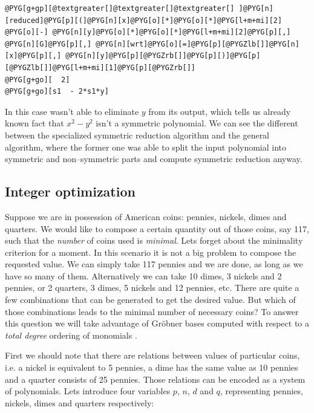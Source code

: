 \begin{Verbatim}[commandchars=@\[\]]
@PYG[g+gp][@textgreater[]@textgreater[]@textgreater[] ]@PYG[n][reduced]@PYG[p][(]@PYG[n][x]@PYG[o][*]@PYG[o][*]@PYG[l+m+mi][2] @PYG[o][-] @PYG[n][y]@PYG[o][*]@PYG[o][*]@PYG[l+m+mi][2]@PYG[p][,] @PYG[n][G]@PYG[p][,] @PYG[n][wrt]@PYG[o][=]@PYG[p][@PYGZlb[]]@PYG[n][x]@PYG[p][,] @PYG[n][y]@PYG[p][@PYGZrb[]]@PYG[p][)]@PYG[p][@PYGZlb[]]@PYG[l+m+mi][1]@PYG[p][@PYGZrb[]]
@PYG[g+go][  2]
@PYG[g+go][s1  - 2*s1*y]
\end{Verbatim}
\noindent
In this case \href{http://docs.python.org/library/functions.html\#reduce}{} wasn't able to eliminate $y$ from its output, which tells us already
known fact that $x^2 - y^2$ isn't a symmetric polynomial. We can see the different between the
specialized symmetric reduction algorithm and the general algorithm, where the former one was
able to split the input polynomial into symmetric and non--symmetric parts and compute symmetric
reduction anyway.


\subsection{Integer optimization}

Suppose we are in possession of American coins: pennies, nickels, dimes and quarters. We would like to
compose a certain quantity out of those coins, say 117, such that the \emph{number} of coins used is \emph{minimal}.
Lets forget about the minimality criterion for a moment. In this scenario it is not a big problem to
compose the requested value. We can simply take 117 pennies and we are done, as long as we have so
many of them. Alternatively we can take 10 dimes, 3 nickels and 2 pennies, or 2 quarters, 3 dimes,
5 nickels and 12 pennies, etc. There are quite a few combinations that can be generated to get the
desired value. But which of those combinations leads to the minimal number of necessary coins? To
answer this question we will take advantage of Gröbner bases computed with respect to a \emph{total
degree} ordering of monomials \cite{Buchberger2007talk}.

First we should note that there are relations between values of particular coins, i.e. a nickel is
equivalent to 5 pennies, a dime has the same value as 10 pennies and a quarter consists of 25 pennies.
Those relations can be encoded as a system of polynomials. Lets introduce four variables $p$, $n$, $d$
and $q$, representing pennies, nickels, dimes and quarters respectively:

